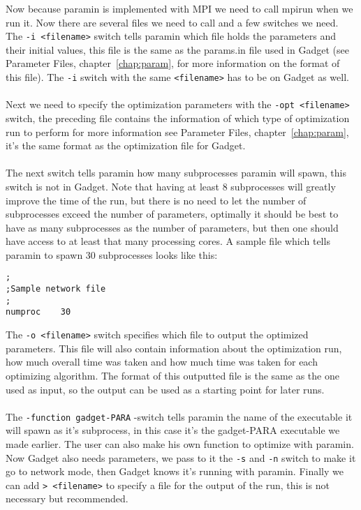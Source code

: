 \documentclass[10pt,twoside]{book}
\begin{document}
Now because paramin is implemented with MPI we need to call mpirun when we run it. Now there are several files we need to call and a few switches
we need. The \texttt{-i <filename>} switch tells paramin which file holds the parameters and their initial values, this file is the same as the 
params.in file used in Gadget (see Parameter Files, chapter~\ref{chap:param}, for more information on the format of this file). The
\texttt{-i} switch with the same \texttt{<filename>} has to be on Gadget as well.
\\
\\
Next we need to specify the 
optimization parameters with the \texttt{-opt <filename>} switch, the preceding file contains the information of which type of optimization run to
perform for more information see Parameter Files, chapter~\ref{chap:param}, it's the same format as the optimization file for Gadget.
\\
\\
The next switch tells paramin how many subprocesses paramin will spawn, this switch is not in Gadget. Note that having at least 8 subprocesses will
greatly improve the time of the run, but there is no need to let the number of subprocesses exceed the number of parameters, optimally it should be
best to have as many subprocesses as the number of parameters, but then one should have access to at least that many processing cores. 
A sample file which tells paramin
to spawn 30 subprocesses looks like this:

{\small\begin{verbatim}
;
;Sample network file
;
numproc    30
\end{verbatim}}

The \texttt{-o <filename>} switch specifies which file to output the optimized parameters. This file will also contain information about the optimization
run, how much overall time was taken and how much time was taken for each optimizing algorithm. The format of this outputted file is the same
as the one used as input, so the output can be used as a starting point for later runs.\\
\\
The \texttt{-function gadget-PARA} -switch tells paramin the name of the executable it will spawn as it's subprocess, in this case it's the gadget-PARA 
executable
we made earlier. The user can also make his own function to optimize with paramin. Now Gadget also needs parameters, we pass to it the \texttt{-s} and
\texttt{-n} switch to make it go to network mode, then Gadget knows it's running with paramin. Finally we can add \texttt{> <filename>} to specify
a file for the output of the run, this is not necessary but recommended.
\end{document}
